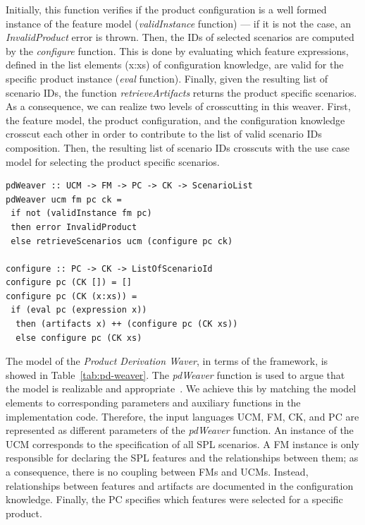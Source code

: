 Initially, this function verifies if the product configuration is a well formed instance of the feature model (\emph{validInstance} function) --- if it is not the case,  an \emph{InvalidProduct} error is thrown. Then, the IDs of selected scenarios are computed by the \emph{configure} function. This is done by evaluating which feature expressions, defined in the list elements (x:xs) of configuration knowledge, are valid for the specific product instance (\emph{eval} function). Finally, given the resulting list of scenario IDs, the function \emph{retrieveArtifacts} returns the product specific scenarios.
As a consequence, we can realize two levels of crosscutting in this weaver. First, the feature model, the product configuration, and the configuration knowledge crosscut each other in order to contribute to the list of valid scenario IDs composition. Then, the resulting list of scenario IDs crosscuts with the use case model for selecting the product specific scenarios.

\begin{lstlisting}[belowskip=20pt,frame=tb,caption={Product derivation weaver function},label=lst:configure]
pdWeaver :: UCM -> FM -> PC -> CK -> ScenarioList
pdWeaver ucm fm pc ck =
 if not (validInstance fm pc)
 then error InvalidProduct
 else retrieveScenarios ucm (configure pc ck)

configure :: PC -> CK -> ListOfScenarioId
configure pc (CK []) = []
configure pc (CK (x:xs)) =
 if (eval pc (expression x))
  then (artifacts x) ++ (configure pc (CK xs))
  else configure pc (CK xs)
\end{lstlisting}

The model of the \emph{Product Derivation Waver},
in terms of the framework, is showed in Table~\ref{tab:pd-weaver}. The \emph{pdWeaver} function is used to argue that the model is realizable and appropriate~\cite{kiczales-ecoop-2003}. We achieve this by matching the model elements
to corresponding parameters and auxiliary functions in the implementation code. Therefore, the input languages UCM, FM, CK, and PC are represented as different parameters
of the \emph{pdWeaver} function. An instance of the UCM corresponds to the specification of all
SPL scenarios. A FM instance is only responsible for declaring the SPL features and the relationships between
them; as a consequence, there is no coupling between FMs and UCMs. Instead, relationships between features and artifacts are documented in the configuration knowledge. Finally, the PC specifies which features were selected
for a specific product.


